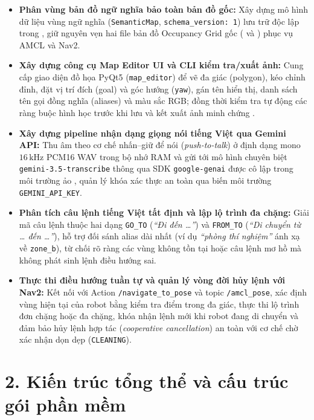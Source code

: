 \begin{itemize}[leftmargin=1.2cm]
  \item \textbf{Phân vùng bản đồ ngữ nghĩa bảo toàn bản đồ gốc:} Xây dựng mô hình dữ liệu vùng ngữ nghĩa (\texttt{SemanticMap}, \texttt{schema\_version: 1}) lưu trữ độc lập trong , giữ nguyên vẹn hai file bản đồ Occupancy Grid gốc ( và ) phục vụ AMCL và Nav2.
  \item \textbf{Xây dựng công cụ Map Editor UI và CLI kiểm tra/xuất ảnh:} Cung cấp giao diện đồ họa PyQt5 (\texttt{map\_editor}) để vẽ đa giác (polygon), kéo chỉnh đỉnh, đặt vị trí đích (goal) và góc hướng (\texttt{yaw}), gán tên hiển thị, danh sách tên gọi đồng nghĩa (aliases) và màu sắc RGB; đồng thời kiểm tra tự động các ràng buộc hình học trước khi lưu và kết xuất ảnh minh chứng .
  \item \textbf{Xây dựng pipeline nhận dạng giọng nói tiếng Việt qua Gemini API:} Thu âm theo cơ chế nhấn--giữ để nói (\textit{push-to-talk}) ở định dạng mono $16\,\text{kHz}$ PCM16 WAV trong bộ nhớ RAM và gửi tới mô hình chuyên biệt \texttt{gemini-3.5-transcribe} thông qua SDK \texttt{google-genai} được cô lập trong môi trường ảo , quản lý khóa xác thực an toàn qua biến môi trường \texttt{GEMINI\_API\_KEY}.
  \item \textbf{Phân tích câu lệnh tiếng Việt tất định và lập lộ trình đa chặng:} Giải mã câu lệnh thuộc hai dạng \texttt{GO\_TO} (\textit{``Đi đến \dots''}) và \texttt{FROM\_TO} (\textit{``Di chuyển từ \dots{} đến \dots''}), hỗ trợ đối sánh alias dài nhất (ví dụ \textit{``phòng thí nghiệm''} ánh xạ về \texttt{zone\_b}), từ chối rõ ràng các vùng không tồn tại hoặc câu lệnh mơ hồ mà không phát sinh lệnh điều hướng sai.
  \item \textbf{Thực thi điều hướng tuần tự và quản lý vòng đời hủy lệnh với Nav2:} Kết nối với Action \texttt{/navigate\_to\_pose} và topic \texttt{/amcl\_pose}, xác định vùng hiện tại của robot bằng kiểm tra điểm trong đa giác, thực thi lộ trình đơn chặng hoặc đa chặng, khóa nhận lệnh mới khi robot đang di chuyển và đảm bảo hủy lệnh hợp tác (\textit{cooperative cancellation}) an toàn với cơ chế chờ xác nhận dọn dẹp (\texttt{CLEANING}).
\end{itemize}

\section*{2. Kiến trúc tổng thể và cấu trúc gói phần mềm}

